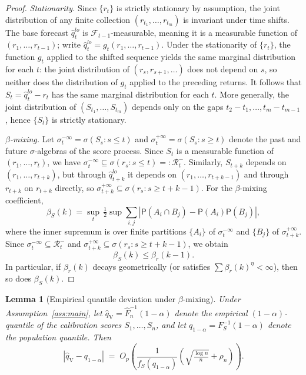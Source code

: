 \documentclass[11pt]{article}
\renewcommand{\P}{\mathsf{P}}
\newcommand{\qV}{\hat{q}_{\scriptscriptstyle\mathrm{V}}}
\newtheorem{lemma}{Lemma}
\begin{document}
\begin{proof}
\textit{Stationarity.}\enspace
Since $\{r_t\}$ is strictly stationary by assumption, the joint
distribution of any finite collection
$(r_{t_1},\ldots,r_{t_m})$ is invariant under time shifts. The
base forecast $\hat q_t^{lo}$ is $\mathcal F_{t-1}$-measurable,
meaning it is a measurable function of $(r_1,\ldots,r_{t-1})$;
write $\hat q_t^{lo}=g_t(r_1,\ldots,r_{t-1})$. Under the
stationarity of $\{r_t\}$, the function $g_t$ applied to the
shifted sequence yields the same marginal distribution for each
$t$: the joint distribution of $(r_s,r_{s+1},\ldots)$ does not
depend on $s$, so neither does the distribution of $g_t$ applied
to the preceding returns. It follows that
$S_t = \hat q_t^{lo}-r_t$ has the same marginal distribution for
each $t$. More generally, the joint distribution of
$(S_{t_1},\ldots,S_{t_m})$ depends only on the gaps
$t_2-t_1,\ldots,t_m-t_{m-1}$, hence $\{S_t\}$ is strictly
stationary.

\textit{$\beta$-mixing.}\enspace
Let $\sigma^{-\infty}_t = \sigma(S_s : s \le t)$ and
$\sigma_t^{+\infty} = \sigma(S_s : s \ge t)$ denote the past and
future $\sigma$-algebras of the score process. Since $S_t$ is a
measurable function of $(r_1,\ldots,r_t)$, we have
$\sigma^{-\infty}_t \subseteq \sigma(r_s : s \le t) =:
\mathcal R_t^-$. Similarly, $S_{t+k}$ depends on
$(r_1,\ldots,r_{t+k})$, but through $\hat q_{t+k}^{lo}$ it depends
on $(r_1,\ldots,r_{t+k-1})$ and through $r_{t+k}$ on $r_{t+k}$
directly, so
$\sigma_{t+k}^{+\infty} \subseteq \sigma(r_s : s \ge t+k-1)$. For
the $\beta$-mixing coefficient,
\[
\beta_S(k)
= \sup_t \, \tfrac{1}{2}\sup\sum_{i,j}
|\P(A_i \cap B_j)-\P(A_i)\P(B_j)|,
\]
where the inner supremum is over finite partitions $\{A_i\}$ of
$\sigma_t^{-\infty}$ and $\{B_j\}$ of $\sigma_{t+k}^{+\infty}$.
Since $\sigma_t^{-\infty} \subseteq \mathcal R_t^-$ and
$\sigma_{t+k}^{+\infty} \subseteq \sigma(r_s : s \ge t+k-1)$, we
obtain
\[
\beta_S(k) \le \beta_r(k-1).
\]
In particular, if $\beta_r(k)$ decays geometrically (or satisfies
$\sum \beta_r(k)^\eta < \infty$), then so does $\beta_S(k)$.
\end{proof}

\begin{lemma}[Empirical quantile deviation under $\beta$-mixing]
\label{lem:quantile_mixing}
Under Assumption~\ref{ass:main}, let
$\qV = \hat F_n^{-1}(1-\alpha)$ denote the empirical
$(1-\alpha)$-quantile of the calibration scores
$S_1,\ldots,S_n$, and let $q_{1-\alpha}=F_S^{-1}(1-\alpha)$
denote the population quantile. Then
\[
|\qV - q_{1-\alpha}|
\;=\;
O_p\!\left(\frac{1}{f_S(q_{1-\alpha})}
\left(\sqrt{\tfrac{\log n}{n}}+\rho_n\right)\right).
\]
\end{lemma}
\end{document}

